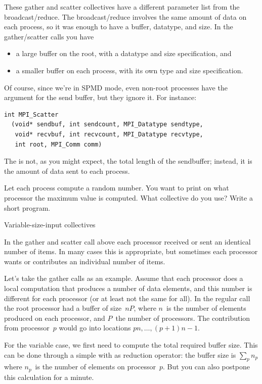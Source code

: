 These gather and scatter collectives have a different parameter list from
the broadcast/reduce. The broadcast/reduce involves the same amount
of data on each process, so it was enough to have a buffer, datatype, and size.
In the gather/scatter calls you have
\begin{itemize}
\item a large buffer on the root, with a datatype and size specification, and
\item a smaller buffer on each process, with its own type and size specification.
\end{itemize}
Of course, since we're in SPMD mode, even non-root processes have
the argument for the send buffer, but they ignore it. For instance:
\begin{verbatim}
int MPI_Scatter
  (void* sendbuf, int sendcount, MPI_Datatype sendtype, 
   void* recvbuf, int recvcount, MPI_Datatype recvtype, 
   int root, MPI_Comm comm) 
\end{verbatim}
The  is not, as you might expect, the total length of the
sendbuffer; instead, it is the amount of data sent to each process.

\begin{exercise}
  \label{ex:randomwhere}
  Let each process compute a random number. You want to print on what processor the
  maximum value is computed. What collective do you use? Write
  a short program.
\end{exercise}

 {Variable-size-input collectives}

In the gather and scatter call above each processor received or sent
an identical number of items. In many cases this is appropriate, but
sometimes each processor wants or contributes an individual number of
items. 

Let's take the gather calls as an example. Assume that each processor 
does a local computation that produces a number of data elements,
and this number is different for each processor (or at least not
the same for all). In the regular  call the root processor
had a buffer of size~$nP$, where $n$~is the number of elements produced
on each processor, and $P$~the number of processors. The contribution
from processor~$p$ would go into locations $pn,\ldots,(p+1)n-1$.

For the variable case, we first need to compute the total required
buffer size. This can be done through a simple 
with  as reduction operator:
the buffer size is $\sum_p n_p$ where $n_p$~is the number of elements
on processor~$p$. But you can also postpone
this calculation for a minute. 

